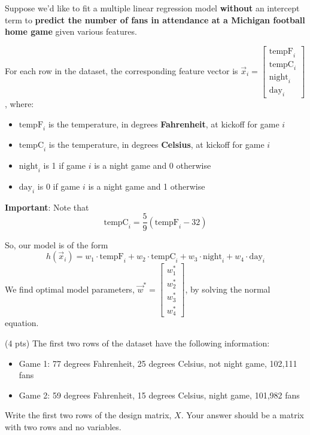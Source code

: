 \documentclass[11pt]{article}
\begin{document}
\begin{prob}[(20 pts)]
Suppose we'd like to fit a multiple linear regression model \textbf{without} an intercept term to \textbf{predict the number of fans in attendance at a Michigan football home game} given various features. 

For each row in the dataset, the corresponding feature vector is $\vec x_i = \begin{bmatrix} \text{tempF}_i \\ \text{tempC}_i \\ \text{night}_i \\ \text{day}_i \end{bmatrix}$, where:
\begin{itemize}
    \item $\text{tempF}_i$ is the temperature, in degrees \textbf{Fahrenheit}, at kickoff for game $i$
    \item $\text{tempC}_i$ is the temperature, in degrees \textbf{Celsius},  at kickoff for game $i$
    \item $\text{night}_i$ is 1 if game $i$ is a night game and 0 otherwise
    \item $\text{day}_i$ is 0 if game $i$ is a night game and 1 otherwise
\end{itemize}

\textbf{Important}: Note that $$\text{tempC}_i = \frac{5}{9} (\text{tempF}_i - 32)$$

So, our model is of the form
$$h(\vec x_i) = w_1 \cdot \text{tempF}_i + w_2 \cdot \text{tempC}_i + w_3 \cdot \text{night}_i + w_4 \cdot \text{day}_i$$
We find optimal model parameters, $\vec w^* = \begin{bmatrix} w_1^* \\ w_2^* \\ w_3^* \\ w_4^* \end{bmatrix}$, by solving the normal equation.

\begin{subprob}(4 pts)
The first two rows of the dataset have the following information:
\begin{itemize}
    \item Game 1: 77 degrees Fahrenheit, 25 degrees Celsius, not night game, 102,111 fans
    \item Game 2: 59 degrees Fahrenheit, 15 degrees Celsius, night game, 101,982 fans
\end{itemize}

Write the first two rows of the design matrix, $X$. Your answer should be a matrix with two rows and no variables. \\


\end{subprob}
\end{prob}
\end{document}
